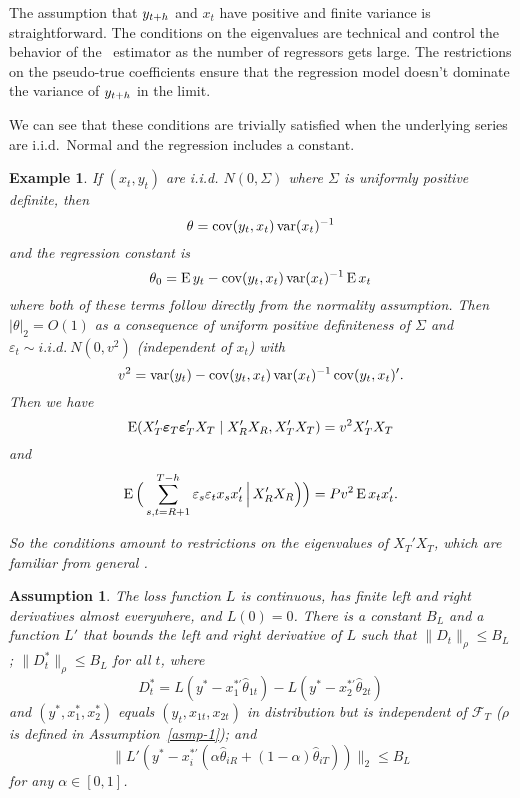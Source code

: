 \documentclass[11pt]{article}
\newcommand{\e}{\varepsilon}
\newtheorem{asmp}{Assumption}
\newtheorem{example}{Example}
\begin{document}
The assumption that $y_{t+h}$ and $x_t$ have positive and finite
variance is straightforward.  The conditions on the eigenvalues are
technical and control the behavior of the \ols\ estimator as the
number of regressors gets large.  The restrictions on the pseudo-true
coefficients ensure that the regression model doesn't dominate the
variance of $y_{t+h}$ in the limit.

We can see that these conditions are trivially satisfied when the
underlying series are i.i.d.\ Normal and the regression includes a
constant.
\begin{example}
  If $(x_{t}, y_t)$ are i.i.d. $N(0, \Sigma)$ where $\Sigma$ is
  uniformly positive definite, then
  \begin{equation*}
    \theta = \operatorname{cov}(y_t, x_t) \operatorname{var}(x_t)^{-1}
  \end{equation*}
  and the regression constant is
  \begin{equation*}
    \theta_0 = \operatorname{E} y_t - \operatorname{cov}(y_t, x_t) \operatorname{var}(x_t)^{-1} \operatorname{E} x_t
  \end{equation*}
  where both of these terms follow directly from the normality
  assumption.  Then $|\theta|_2 = O(1)$ as a consequence of uniform
  positive definiteness of $\Sigma$ and $\varepsilon_t \sim i.i.d.\
  N(0, v^2)$ (independent of $x_t$) with
  \begin{equation*}
    v^2 = \operatorname{var}(y_t) - \operatorname{cov}(y_t, x_t) \operatorname{var}(x_t)^{-1} \operatorname{cov}(y_t, x_t)'.
  \end{equation*}
  Then we have
  \begin{equation*}
    \operatorname{E}(X_{T}'\boldsymbol{\varepsilon}_{T}\boldsymbol{\varepsilon}_{T}'X_T \mid X_{R}'X_{R}, X_{T}'X_{T})
    = v^2 X_{T}'X_{T}
  \end{equation*}
  and
  \begin{equation*}
    \E\Big( \sum_{s,t=R+1}^{T-h} \e_s \e_t x_s x_t'
    \,\Big|\, X_{R}'X_{R} \Big)\Big) = P v^2 \E x_t x_t'.
  \end{equation*}

  So the conditions amount to restrictions on the eigenvalues of
  $X_T'X_T$, which are familiar from general \ols.
\end{example}

\begin{asmp}\label{asmp-3}
  The loss function $L$ is continuous, has finite left and right
  derivatives almost everywhere, and $L(0) = 0$.  There is a constant
  $B_L$ and a function $L'$ that bounds the left and right derivative
  of $L$ such that $\|D_t\|_\rho \leq B_L$; $\|D_t^*\|_\rho \leq B_L$
  for all $t$, where
  \begin{equation*}
    D_t^* = L(y^* - x_1^{*\prime}\hat\theta_{1t})
    - L(y^* - x_2^{*\prime}\hat\theta_{2t})
  \end{equation*}
  and $(y^*, x_1^*, x_2^*)$ equals $(y_t, x_{1t}, x_{2t})$ in
  distribution but is independent of $\mathcal{F}_T$ ($\rho$ is defined
  in Assumption~\ref{asmp-1}); and
  \begin{equation*}
    \| L'(y^* - x_{i}^{*\prime}
    (\alpha \hat{\theta}_{iR} + (1-\alpha) \hat{\theta}_{iT})) \|_2
    \leq B_L
  \end{equation*}
  for any $\alpha \in [0,1]$.
\end{asmp}
\end{document}
